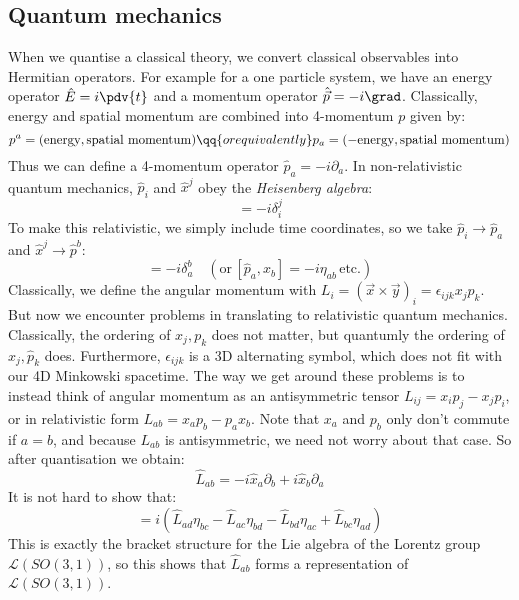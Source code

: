 \documentclass{jknotes} %
\begin{document}
\subsection{Quantum mechanics}
When we quantise a classical theory, we convert classical observables into Hermitian operators. For example for a one particle system, we have an energy operator \(\hat{E} = i \pdv{t}\) and a momentum operator \(\hat{\vec{p}} = -i\grad\). Classically, energy and spatial momentum are combined into 4-momentum \(p\) given by:
\begin{equation}
    p^a = (\text{energy},\text{spatial momentum}) \qq{or equivalently} p_a = (-\text{energy},\text{spatial momentum})
\end{equation}
Thus we can define a 4-momentum operator \(\hat{p}_a=-i\partial_a\). In non-relativistic quantum mechanics, \(\hat{p}_i\) and \(\hat{x}^j\) obey the \emph{Heisenberg algebra}:
\begin{equation}
    [\hat{p}_i,\hat{x}^j] = -i\delta^j_i
\end{equation}
To make this relativistic, we simply include time coordinates, so we take \(\hat{p}_i \rightarrow \hat{p}_a\) and \(\hat{x}^j \rightarrow \hat{p}^b\):
\begin{equation}
    [\hat{p}_a,\hat{x}^b] = -i\delta^b_a \quad (\text{or}\, [\hat{p}_a,\hat{x}_b]=-i\eta_{ab} \,\text{etc.})
\end{equation}
Classically, we define the angular momentum with \(L_i = (\vec{x}\times\vec{y})_i = \epsilon_{ijk}x_jp_k\). But now we encounter problems in translating to relativistic quantum mechanics. Classically, the ordering of \(x_j,p_k\) does not matter, but quantumly the ordering of \(\hat{x}_j,\hat{p}_k\) does. Furthermore, \(\epsilon_{ijk}\) is a 3D alternating symbol, which does not fit with our 4D Minkowski spacetime. The way we get around these problems is to instead think of angular momentum as an antisymmetric tensor \(L_{ij} = x_ip_j-x_jp_i\), or in relativistic form \(L_{ab} = x_ap_b-p_ax_b\). Note that \(x_a\) and \(p_b\) only don't commute if \(a=b\), and because \(L_{ab}\) is antisymmetric, we need not worry about that case. So after quantisation we obtain:
\begin{equation}
    \hat{L}_{ab} = -i\hat{x}_a\partial_b + i\hat{x}_b\partial_a
\end{equation}
It is not hard to show that:
\begin{equation}
    [\hat{L}_{ab},\hat{L}_{cd}] = i( \hat{L}_{ad}\eta_{bc}-\hat{L}_{ac}\eta_{bd}-\hat{L}_{bd}\eta_{ac}+\hat{L}_{bc}\eta_{ad} )
\end{equation}
This is exactly the bracket structure for the Lie algebra of the Lorentz group \(\mathcal{L}(SO(3,1))\), so this shows that \(\hat{L}_{ab}\) forms a representation of \(\mathcal{L}(SO(3,1))\).
\end{document}
